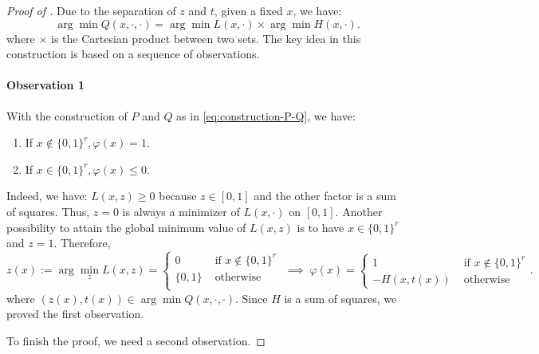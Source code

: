 \documentclass{article}
\newcommand{\argmin}{\arg\min}
\newcommand{\firstvar}{x}
\newcommand{\valbilevel}{\varphi}
\theoremstyle{plain}
\theoremstyle{definition}
\begin{document}
\begin{proof}[Proof of {}]
    
    Due to the separation of $z$ and $t$, given a fixed $x$, we have:
    \begin{equation}
        \label{eq:structure_of_optimum}
        \argmin Q(x, \cdot, \cdot) = \argmin L(x, \cdot) \times \argmin H(x, \cdot).
    \end{equation}
    where $\times$ is the Cartesian product between two sets. The key idea in this construction is based on a sequence of observations.

    \paragraph{Observation 1} With the construction of $P$ and $Q$ as in \eqref{eq:construction-P-Q}, we have:
    \begin{enumerate}
        \item If $\firstvar \notin \{0,1\}^r, \valbilevel(\firstvar) = 1$.
        \item If $\firstvar \in \{0,1\}^r, \valbilevel(\firstvar) \leq 0$. 
    \end{enumerate}
    
    Indeed, we have: $L(x,z) \geq 0$ because $z \in [0,1]$ and the other factor is a sum of squares. Thus, $z = 0$ is always a minimizer of $L(x,\cdot)$ on $[0,1]$. Another possibility to attain the global minimum value of $L(\firstvar, z)$ is to have $x \in \{0,1\}^r$ and $z = 1$. Therefore,
    \begin{equation}
        \label{eq:optimal-z-1}
        z(x):= \arg\min_z L(x,z) = \begin{cases}
            0 & \text{ if } x \notin \{0,1\}^r\\
            \{0,1\} & \text{ otherwise } \\
        \end{cases} \;\implies\; \valbilevel(\firstvar) = \begin{cases}
            1 & \text{ if } x \notin \{0,1\}^r\\
            -H(\firstvar, t(x)) & \text{ otherwise}
        \end{cases}.
    \end{equation}
    where $(z(\firstvar), t(\firstvar)) \in \argmin Q(\firstvar, \cdot, \cdot)$. Since $H$ is a sum of squares, we proved the first observation.

    To finish the proof, we need a second observation.

\end{proof}
\end{document}
